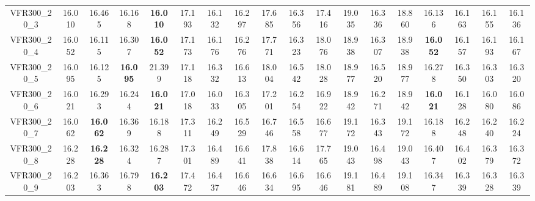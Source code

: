 \begin{tabular}{cc|ccc|ccccccccccccc}
VFR300\_20\_3      & 16.010           & 16.465           & 16.168           & {\bf 16.010}     & 17.193           & 16.132           & 16.297           & 17.685           & 16.356           & 17.416           & 19.035           & 16.336           & 18.860           & 16.136           & 16.163           & 16.155           & 16.136          \\ 
VFR300\_20\_4      & 16.052           & 16.115           & 16.307           & {\bf 16.052}     & 17.173           & 16.176           & 16.276           & 17.771           & 16.323           & 18.076           & 18.938           & 16.307           & 18.938           & {\bf 16.052}     & 16.157           & 16.193           & 16.167          \\ 
VFR300\_20\_5      & 16.095           & 16.125           & {\bf 16.095}     & 21.399           & 17.118           & 16.332           & 16.613           & 18.004           & 16.542           & 18.028           & 18.977           & 16.520           & 18.977           & 16.278           & 16.350           & 16.303           & 16.320          \\ 
VFR300\_20\_6      & 16.021           & 16.293           & 16.244           & {\bf 16.021}     & 17.018           & 16.033           & 16.305           & 17.201           & 16.254           & 16.922           & 18.942           & 16.271           & 18.942           & {\bf 16.021}     & 16.128           & 16.080           & 16.086          \\ 
VFR300\_20\_7      & 16.062           & {\bf 16.062}     & 16.369           & 16.188           & 17.311           & 16.249           & 16.529           & 16.746           & 16.558           & 16.677           & 19.172           & 16.343           & 19.172           & 16.188           & 16.248           & 16.240           & 16.224          \\ 
VFR300\_20\_8      & 16.228           & {\bf 16.228}     & 16.324           & 16.287           & 17.301           & 16.489           & 16.641           & 17.838           & 16.614           & 17.765           & 19.043           & 16.498           & 19.043           & 16.407           & 16.402           & 16.379           & 16.372          \\ 
VFR300\_20\_9      & 16.203           & 16.363           & 16.798           & {\bf 16.203}     & 17.472           & 16.437           & 16.646           & 16.634           & 16.695           & 16.646           & 19.181           & 16.489           & 19.108           & 16.347           & 16.339           & 16.328           & 16.339          \\ 

\end{tabular}
